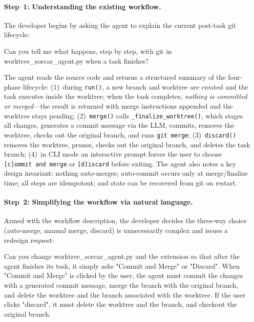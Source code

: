 \documentclass{article}
\begin{document}
\paragraph{Step~1: Understanding the existing workflow.} The developer begins by asking the agent to explain the current post-task git lifecycle:

\begin{prompt}
Can you tell me what happens, step by step, with git in worktree_sorcar_agent.py when a task finishes?
\end{prompt}

\noindent The agent reads the source code and returns a structured summary of the four-phase lifecycle: (1)~during \texttt{run()}, a new branch and worktree are created and the task executes inside the worktree; when the task completes, \emph{nothing is committed or merged}---the result is returned with merge instructions appended and the worktree stays pending; (2)~\texttt{merge()} calls \texttt{\_finalize\_worktree()}, which stages all changes, generates a commit message via the LLM, commits, removes the worktree, checks out the original branch, and runs \texttt{git merge}; (3)~\texttt{discard()} removes the worktree, prunes, checks out the original branch, and deletes the task branch; (4)~in CLI mode an interactive prompt forces the user to choose \texttt{[c]ommit and merge} or \texttt{[d]iscard} before exiting. The agent also notes a key design invariant: nothing auto-merges; auto-commit occurs only at merge/finalize time; all steps are idempotent; and state can be recovered from git on restart.

\paragraph{Step~2: Simplifying the workflow via natural language.} Armed with the workflow description, the developer decides the three-way choice (auto-merge, manual merge, discard) is unnecessarily complex and issues a redesign request:

\begin{prompt}
Can you change worktree_sorcar_agent.py and the extension so that after the agent 
finishes its task, it simply asks "Commit and Merge" or "Discard". When "Commit 
and Merge" is clicked by the user, the agent must commit the changes with a 
generated commit message, merge the branch with the original branch, and delete 
the worktree and the branch associated with the worktree. If the user clicks 
"discard", it must delete the worktree and the branch, and checkout the 
original branch.
\end{prompt}
\end{document}
